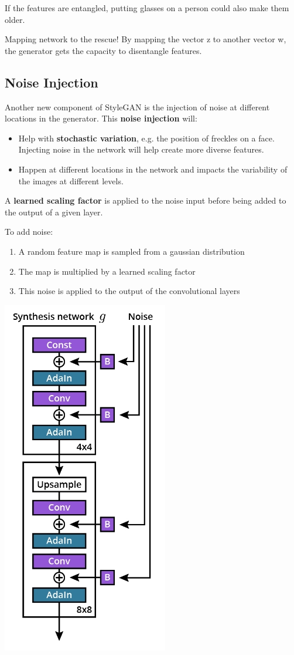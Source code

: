 If the features are entangled, putting glasses on a person could also make them older. \newline

Mapping network to the rescue! By mapping the vector z to another vector w, the generator gets the capacity to disentangle features.
\subsection{Noise Injection}
Another new component of StyleGAN is the injection of noise at different locations in the generator. This \textbf{noise injection} will:

\begin{itemize}
    \item Help with \textbf{stochastic variation}, e.g. the position of freckles on a face. Injecting noise in the network will help create more diverse features.
    \item Happen at different locations in the network and impacts the variability of the images at different levels.
\end{itemize}
A \textbf{learned scaling factor} is applied to the noise input before being added to the output of a given layer. \newline

To add noise:
\begin{enumerate}
    \item A random feature map is sampled from a gaussian distribution
    \item The map is multiplied by a learned scaling factor
    \item This noise is applied to the output of the convolutional layers
\end{enumerate}

\includegraphics[width=0.5\linewidth]{img//genAdvNet//modernGAN/screen-shot-2022-06-30-at-4.47.08-pm.jpeg}


